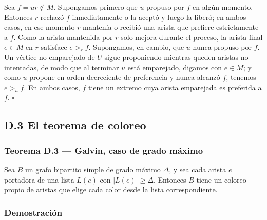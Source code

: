 \documentclass[spanish,11pt,a4paper]{article}
\begin{document}
Sea \(f=ur\notin M\). Supongamos primero que \(u\) propuso por \(f\) en
algún momento. Entonces \(r\) rechazó \(f\) inmediatamente o la aceptó y
luego la liberó; en ambos casos, en ese momento \(r\) mantenía o recibió
una arista que prefiere estrictamente a \(f\). Como la arista mantenida
por \(r\) solo mejora durante el proceso, la arista final \(e\in M\) en
\(r\) satisface \(e>_rf\). Supongamos, en cambio, que \(u\) nunca
propuso por \(f\). Un vértice no emparejado de \(U\) sigue proponiendo
mientras queden aristas no intentadas, de modo que al terminar \(u\)
está emparejado, digamos con \(e\in M\); y como \(u\) propone en orden
decreciente de preferencia y nunca alcanzó \(f\), tenemos \(e>_uf\). En
ambos casos, \(f\) tiene un extremo cuya arista emparejada es preferida
a \(f\). \(\square\)

\subsection{D.3 El teorema de coloreo}\label{d.3-el-teorema-de-coloreo}

\subsubsection{Teorema D.3 --- Galvin, caso de grado
máximo}\label{teorema-d.3-galvin-caso-de-grado-muxe1ximo}

Sea \(B\) un grafo bipartito simple de grado máximo \(\Delta\), y sea
cada arista \(e\) portadora de una lista \(L(e)\) con
\(|L(e)|\ge\Delta\). Entonces \(B\) tiene un coloreo propio de aristas
que elige cada color desde la lista correspondiente.

\subsubsection{Demostración}\label{demostraciuxf3n-11}
\end{document}
